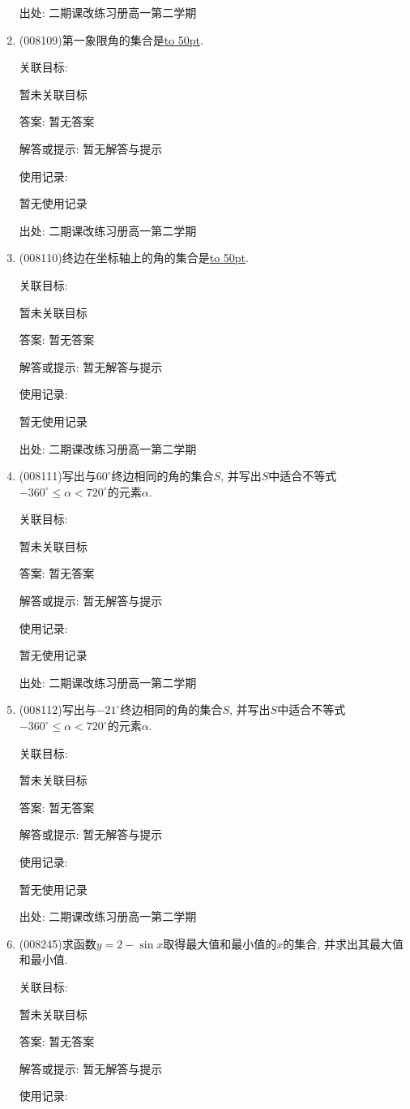 \documentclass[10pt,a4paper]{article}
\newcommand{\blank}[1]{\underline{\hbox to #1pt{}}}
\begin{document}
\begin{enumerate}[1.]
出处: 二期课改练习册高一第二学期
\item { (008109)}第一象限角的集合是\blank{50}.


关联目标:

暂未关联目标

答案: 暂无答案

解答或提示: 暂无解答与提示

使用记录:

暂无使用记录


出处: 二期课改练习册高一第二学期
\item { (008110)}终边在坐标轴上的角的集合是\blank{50}.


关联目标:

暂未关联目标

答案: 暂无答案

解答或提示: 暂无解答与提示

使用记录:

暂无使用记录


出处: 二期课改练习册高一第二学期
\item { (008111)}写出与$60^\circ$终边相同的角的集合$S$, 并写出$S$中适合不等式$-360^\circ\le \alpha <720^\circ$的元素$\alpha$.


关联目标:

暂未关联目标

答案: 暂无答案

解答或提示: 暂无解答与提示

使用记录:

暂无使用记录


出处: 二期课改练习册高一第二学期
\item { (008112)}写出与$-21^\circ$终边相同的角的集合$S$, 并写出$S$中适合不等式$-360^\circ\le \alpha <720^\circ$的元素$\alpha$.


关联目标:

暂未关联目标

答案: 暂无答案

解答或提示: 暂无解答与提示

使用记录:

暂无使用记录


出处: 二期课改练习册高一第二学期
\item { (008245)}求函数$y=2-\sin x$取得最大值和最小值的$x$的集合, 并求出其最大值和最小值.


关联目标:

暂未关联目标

答案: 暂无答案

解答或提示: 暂无解答与提示

使用记录:


\end{enumerate}
\end{document}
